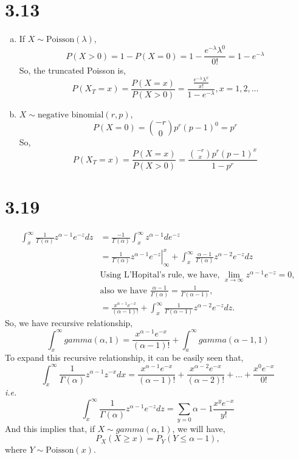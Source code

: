 \documentclass[letter]{article}
\begin{document}
    \section*{3.13}
    \begin{enumerate}[(a)]
    \item If $X \sim \text{Poisson}(\lambda)$, 
    \[
    P(X > 0) = 1 - P(X = 0) = 1 - \frac{e^{-\lambda} \lambda^0}{0!} = 1 - e^{-\lambda}
    \]
    So, the truncated Poisson is,
    \[
    P(X_T = x) = \frac{P(X=x)}{P(X > 0)} = \frac{\frac{e^{-\lambda} \lambda^x}{x!}}{1-e^{-\lambda}}, x = 1, 2, \dots
    \]
    \item $X \sim \text{negative binomial}(r, p)$,
    \[
    P(X = 0) = \binom{-r}{0} p^r(p-1)^0 = p^r
    \]
    So,
    \[
    P(X_T = x) = \frac{P(X=x)}{P(X > 0)} = \frac{\binom{-r}{x} p^r (p-1)^x}{1-p^r}
    \]
    \end{enumerate}

    \section*{3.19}
    \begin{align*}
    \int_x^\infty \frac{1}{\Gamma(\alpha)} z^{\alpha-1} e^{-z} dz & =
    \frac{-1}{\Gamma(\alpha)} \int_x^\infty z^{\alpha-1} d e^{-z} \\
    & = \left. \frac{1}{\Gamma(\alpha)} z^{\alpha-1}e^{-z} \right|^x_\infty + 
    \int_x^\infty \frac{\alpha-1}{\Gamma(\alpha)} z^{\alpha-2}e^{-z} dz\\
    & \text{Using L'Hopital's rule, we have, $\lim_{x\to \infty} z^{\alpha-1} e^{-z} = 0$},\\
    & \text{also we have $\frac{\alpha-1}{\Gamma(\alpha)} = \frac{1}{\Gamma(\alpha-1)}$}, \\
    & = \frac{x^{\alpha-1}e^{-x}}{(\alpha-1)!} + \int_x^\infty \frac{1}{\Gamma(\alpha-1)} z^{\alpha-2} e^{-z}dz.
    \end{align*}
    So, we have recursive relationship,
    \[
    \int_x^\infty gamma(\alpha, 1) = \frac{x^{\alpha-1}e^{-x}}{(\alpha-1)!}  + \int_a^\infty gamma(\alpha-1, 1)
    \]
    To expand this recursive relationship, it can be easily seen that,
    \[
    \int_x^\infty \frac{1}{\Gamma(\alpha)} z^{\alpha-1} z^{-x} dx = \frac{x^{\alpha-1}e^{-x}}{(\alpha-1)!} + \frac{x^{\alpha-2}e^{-x}}{(\alpha-2)!} + \dots + \frac{x^{0}e^{-x}}{0!}
    \]
    \emph{i.e.}
    \[
    \int_x^\infty \frac{1}{\Gamma(\alpha)} z^{\alpha-1} e^{-z} dz = \sum_{y=0}{\alpha-1} \frac{x^y e^{-x}}{y!}
    \]
    And this implies that, if $X \sim gamma(\alpha, 1)$, we will have,
    \[
    P_X(X \ge x) = P_Y(Y \le \alpha-1),
    \]
    where $Y \sim \text{Poisson}(x)$.
\end{document}
